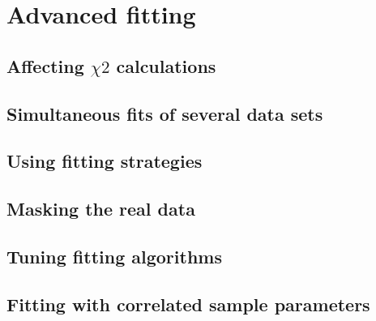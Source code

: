 

\section {Advanced fitting} 

\subsection{Affecting $\chi2$ calculations}
\subsection{Simultaneous fits of several data sets}
\subsection{Using fitting strategies}
\subsection{Masking the real data}
\subsection{Tuning fitting algorithms}
\subsection{Fitting with correlated sample parameters}


